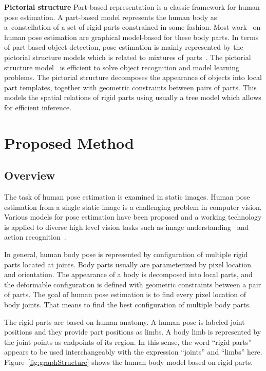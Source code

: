 \documentclass[master,english,final]{postech-ucs}
\begin{document}
\textbf{Pictorial structure }
Part-based representation is a classic framework for human pose estimation. A part-based model represents the human body as a~constellation of a set of rigid parts constrained in some fashion. Most work~\cite{pose_multiTree:2008, PS_revisited:2009, pose_latentTree:2013} on human pose estimation are graphical model-based for these body parts. In terms of part-based object detection, pose estimation is mainly represented by the pictorial structure models which is related to mixtures of parts~\cite{PS_original:2005, detection_DPM:2010}. The pictorial structure model~\cite{PS_original:2005} is efficient to solve object recognition and model learning problems. The pictorial structure decomposes the appearance of objects into local part templates, together with geometric constraints between pairs of parts. This models the spatial relations of rigid parts using usually a tree model which allows for efficient inference.


\chapter{Proposed Method}


\section{Overview}

The task of human pose estimation is examined in static images. Human pose estimation from a single static image is a challenging problem in computer vision. Various models for pose estimation have been proposed and a working technology is applied to diverse high level vision tasks such as image understanding~\cite{imageUnderstanding:2013} and action recognition~\cite{actionRecognition:2013}.

In general, human body pose is represented by configuration of multiple rigid parts located at joints. Body parts usually are parameterized by pixel location and orientation. The appearance of a body is decomposed into local parts, and the deformable configuration is defined with geometric constraints between a pair of parts. The goal of human pose estimation is to find every pixel location of body joints. That means to find the best configuration of multiple body parts.

The rigid parts are based on human anatomy. A human pose is labeled joint positions and they provide part positions as limbs. A body limb is represented by the joint points as endpoints of its region. In this sense, the word ``rigid parts'' appears to be used interchangeably with the expression ``joints'' and ``limbs'' here. Figure~\ref{fig:graphStructure} shows the human body model based on rigid parts.
\end{document}
